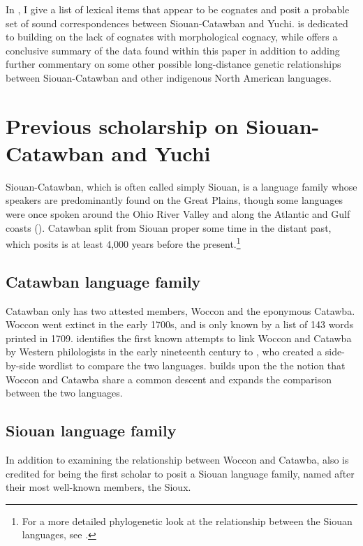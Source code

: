 \documentclass[output=paper]{LSP/langsci}
\begin{document}
In , I give a list of lexical items that appear to be cognates and posit a probable set of sound correspondences between Siouan-Catawban and Yuchi.  is dedicated to building on the lack of cognates with morphological cognacy, while  offers a conclusive summary of the data found within this paper in addition to adding further commentary on some other possible long-distance genetic relationships between Siouan-Catawban and other indigenous North American languages.

\section{Previous scholarship on Siouan-Catawban and Yuchi}\label{sec:kasak:2}

Siouan-Catawban, which is often called simply Siouan, is a language family whose speakers are predominantly found on the Great Plains, though some languages were once spoken around the Ohio River Valley and along the Atlantic and Gulf coasts (\citealt{Mithun1999}). Catawban split from Siouan proper some time in the distant past, which \citet{Rankin1996} posits is at least 4,000 years before the present.\footnote{For a more detailed phylogenetic look at the relationship between the Siouan languages, see \citet{Rankin2010}.}

\subsection{Catawban language family}

Catawban only has two attested members, Woccon and the eponymous Catawba. Woccon went extinct in the early 1700s, and is only known by a list of 143 words printed in 1709. \citet{Carter1980} identifies the first known attempts to link Woccon and Catawba by Western philologists in the early nineteenth century to  \citet{AdelungVater1816}, who created a side-by-side wordlist to compare the two languages. \citet{Gallatin1836} builds upon the the notion that Woccon and Catawba share a common descent and expands the comparison between the two languages.

\subsection{Siouan language family}

In addition to examining the relationship between Woccon and Catawba, \citet{Gallatin1836} also is credited for being the first scholar to posit a Siouan language family, named after their most well-known members, the Sioux. 
\end{document}
